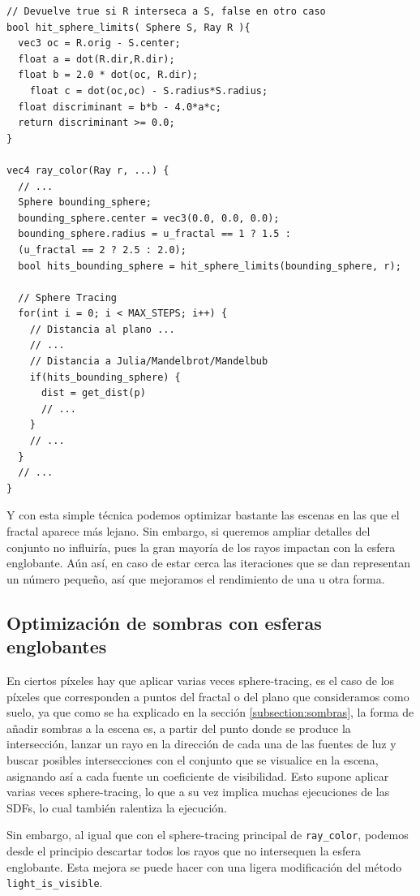 \begin{lstlisting}
// Devuelve true si R interseca a S, false en otro caso
bool hit_sphere_limits( Sphere S, Ray R ){
  vec3 oc = R.orig - S.center;
  float a = dot(R.dir,R.dir);
  float b = 2.0 * dot(oc, R.dir);
	float c = dot(oc,oc) - S.radius*S.radius;
  float discriminant = b*b - 4.0*a*c;
  return discriminant >= 0.0;
}

vec4 ray_color(Ray r, ...) {
  // ... 
  Sphere bounding_sphere;
  bounding_sphere.center = vec3(0.0, 0.0, 0.0);
  bounding_sphere.radius = u_fractal == 1 ? 1.5 : 
  (u_fractal == 2 ? 2.5 : 2.0);
  bool hits_bounding_sphere = hit_sphere_limits(bounding_sphere, r);
  
  // Sphere Tracing
  for(int i = 0; i < MAX_STEPS; i++) {
    // Distancia al plano ... 
    // ... 
    // Distancia a Julia/Mandelbrot/Mandelbub
    if(hits_bounding_sphere) {
      dist = get_dist(p)
      // ... 
    }
    // ... 
  }
  // ...
}
\end{lstlisting}

Y con esta simple técnica podemos optimizar bastante las escenas en las que el fractal aparece más lejano. Sin embargo, si queremos ampliar detalles del conjunto no influiría, pues la gran mayoría de los rayos impactan con la esfera englobante. Aún así, en caso de estar cerca las iteraciones que se dan representan un número pequeño, así que mejoramos el rendimiento de una u otra forma.

\subsection{Optimización de sombras con esferas englobantes}

En ciertos píxeles hay que aplicar varias veces sphere-tracing, es el caso de los píxeles que corresponden a puntos del fractal o del plano que consideramos como suelo, ya que como se ha explicado en la sección \ref{subsection:sombras}, la forma de añadir sombras a la escena es, a partir del punto donde se produce la intersección, lanzar un rayo en la dirección de cada una de las fuentes de luz y buscar posibles intersecciones con el conjunto que se visualice en la escena, asignando así a cada fuente un coeficiente de visibilidad. Esto supone aplicar varias veces sphere-tracing, lo que a su vez implica muchas ejecuciones de las SDFs, lo cual también ralentiza la ejecución. 

Sin embargo, al igual que con el sphere-tracing principal de \verb|ray_color|, podemos desde el principio descartar todos los rayos que no intersequen la esfera englobante. Esta mejora se puede hacer con una ligera modificación del método \verb|light_is_visible|.

